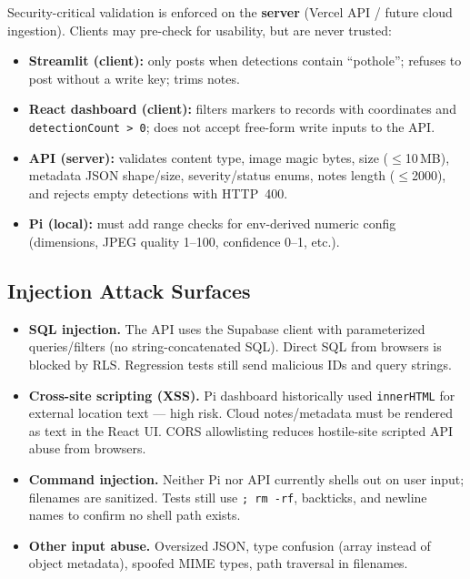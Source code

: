 \documentclass[12pt]{article}
\begin{document}
Security-critical validation is enforced on the \textbf{server} (Vercel API /
future cloud ingestion). Clients may pre-check for usability, but are never
trusted:

\begin{itemize}
    \item \textbf{Streamlit (client):} only posts when detections contain
          ``pothole''; refuses to post without a write key; trims notes.
    \item \textbf{React dashboard (client):} filters markers to records with
          coordinates and \texttt{detectionCount > 0}; does not accept free-form
          write inputs to the API.
    \item \textbf{API (server):} validates content type, image magic bytes, size
          ($\leq$10\,MB), metadata JSON shape/size, severity/status enums, notes
          length ($\leq$2000), and rejects empty detections with HTTP~400.
    \item \textbf{Pi (local):} must add range checks for env-derived numeric
          config (dimensions, JPEG quality 1--100, confidence 0--1, etc.).
\end{itemize}

\subsection{Injection Attack Surfaces}

\begin{itemize}
    \item \textbf{SQL injection.} The API uses the Supabase client with
          parameterized queries/filters (no string-concatenated SQL). Direct SQL
          from browsers is blocked by RLS. Regression tests still send malicious
          IDs and query strings.
    \item \textbf{Cross-site scripting (XSS).} Pi dashboard historically used
          \texttt{innerHTML} for external location text --- high risk. Cloud
          notes/metadata must be rendered as text in the React UI. CORS
          allowlisting reduces hostile-site scripted API abuse from browsers.
    \item \textbf{Command injection.} Neither Pi nor API currently shells out on
          user input; filenames are sanitized. Tests still use
          \texttt{; rm -rf}, backticks, and newline names to confirm no shell
          path exists.
    \item \textbf{Other input abuse.} Oversized JSON, type confusion
          (array instead of object metadata), spoofed MIME types, path traversal
          in filenames.
\end{itemize}
\end{document}
